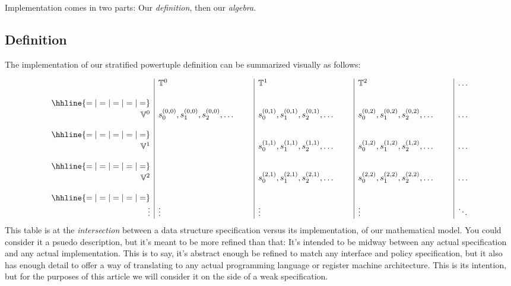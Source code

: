 \documentclass[twoside]{article}
\newcommand{\nthpt}[2][T]{\ensuremath{\mathbb{#1}^{#2}}}
\newcommand{\nthut}[2][V]{\ensuremath{\mathbb{#1}^{#2}}}
\newcommand{\sifter}[3]{\ensuremath{s^{(#1, #2)}_{#3}}}
\begin{document}
Implementation comes in two parts: Our \emph{definition}, then our \emph{algebra}.

\subsection*{Definition}

The implementation of our stratified powertuple definition can be summarized visually as follows:

$$ \begin{array}{r|l|l|l|l}
									&
\nthpt{0}								&
\nthpt{1}								&
\nthpt{2}								& \ldots \\
									& & & & \\
\hhline{=|=|=|=|=}
									& & & & \\
\nthut{0}								&
\sifter{0}{0}{0}, \sifter{0}{0}{1}, \sifter{0}{0}{2}, \ldots\qquad	&
\sifter{0}{1}{0}, \sifter{0}{1}{1}, \sifter{0}{1}{2}, \ldots\qquad	&
\sifter{0}{2}{0}, \sifter{0}{2}{1}, \sifter{0}{2}{2}, \ldots\qquad	& \ldots \\
									& & & & \\
\hhline{=|=|=|=|=}
									& & & & \\
\nthut{1}								&
									&
\sifter{1}{1}{0}, \sifter{1}{1}{1}, \sifter{1}{1}{2}, \ldots\qquad	&
\sifter{1}{2}{0}, \sifter{1}{2}{1}, \sifter{1}{2}{2}, \ldots\qquad	& \ldots \\
									& & & & \\
\hhline{=|=|=|=|=}
									& & & & \\
\nthut{2}								&
									&
\sifter{2}{1}{0}, \sifter{2}{1}{1}, \sifter{2}{1}{2}, \ldots\qquad	&
\sifter{2}{2}{0}, \sifter{2}{2}{1}, \sifter{2}{2}{2}, \ldots\qquad	& \ldots \\
									& & & & \\
\hhline{=|=|=|=|=}
									& & & & \\
\vdots	& \vdots & \vdots & \vdots & \ddots
\end{array} $$
This table is at the \emph{intersection} between a data structure specification versus its implementation, of our mathematical model.
You could consider it a psuedo description, but it's meant to be more refined than that: It's intended to be midway between
any actual specification and any actual implementation. This is to say, it's abstract enough be refined to match any
interface and policy specification, but it also has enough detail to offer a way of translating to any actual programming
language or register machine architecture. This is its intention, but for the purposes of this article we will consider
it on the side of a weak specification.
\end{document}

